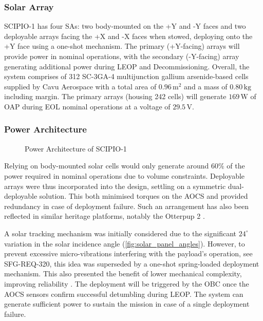 \documentclass[a4paper, 11pt, conference]{IEEEtran}
\begin{document}
\subsubsection{Solar Array}
SCIPIO-1 has four SAs: two body-mounted on the +Y and -Y faces and two deployable arrays facing the +X and -X faces when stowed, deploying onto the +Y face using a one-shot mechanism. The primary (+Y-facing) arrays will provide power in nominal operations, with the secondary (-Y-facing) array  generating additional power during LEOP and Decommissioning. Overall, the system comprises of 312 SC-3GA-4 multijunction gallium arsenide-based cells supplied by Cavu Aerospace \cite{CavuAerospace2023} with a total area of $0.96\,\mathrm{m}^2$ and a mass of $0.80\,\mathrm{kg}$ including margin. The primary arrays (housing 242 cells) will generate $169\,\mathrm{W}$ of OAP during EOL nominal operations at a voltage of $29.5\,\mathrm{V}$. 

\subsubsection{Power Architecture}
\begin{figure}[H]
    \centering
    \resizebox{0.5\linewidth}{!}{%
    }
    \caption{Power Architecture of SCIPIO-1}
    \label{fig:powerarchitecture}
\end{figure}

Relying on body-mounted solar cells would only generate around $60\%$ of the power required in nominal operations due to volume constraints. Deployable arrays were thus incorporated into the design, settling on a symmetric dual-deployable solution. This both minimised torques on the AOCS and provided redundancy in case of deployment failure. Such an arrangement has also been reflected in similar heritage platforms, notably the Otterpup 2 \cite{StarfishSpace2024}. 

A solar tracking mechanism was initially considered due to the significant $24^\circ$ variation in the solar incidence angle (\autoref{fig:solar_panel_angles}). However, to prevent excessive micro-vibrations interfering with the payload’s operation, see SFG-REQ-320, this idea was superseded by a one-shot spring-loaded deployment mechanism. This also presented the benefit of lower mechanical complexity, improving reliability \cite{RiveraStewart2021Deployables}. The deployment will be triggered by the OBC once the AOCS sensors confirm successful detumbling during LEOP. The system can generate sufficient power to sustain the mission in case of a single deployment failure. 
\end{document}
